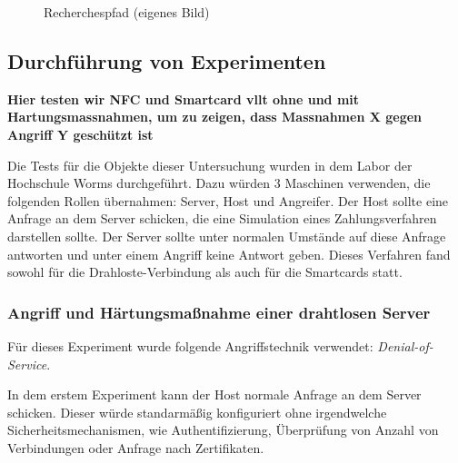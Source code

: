 \begin{landscape}
  \thispagestyle{mylandscape}
  \begin{figure}[h]  
  \centering
         \caption{Recherchespfad (eigenes Bild)}
          \label{fig:diagramfrage}
  \end{figure}
\end{landscape}


\subsection{Durchführung von Experimenten}
\textbf{Hier testen wir NFC und Smartcard vllt ohne und mit Hartungsmassnahmen, um zu zeigen, dass Massnahmen X gegen
Angriff Y geschützt ist}

Die Tests für die Objekte dieser Untersuchung wurden in dem Labor der Hochschule Worms durchgeführt. 
Dazu würden 3 Maschinen verwenden, die folgenden Rollen übernahmen: Server, Host und Angreifer. 
Der Host sollte eine Anfrage an dem Server schicken, die eine Simulation eines Zahlungsverfahren darstellen sollte.
Der Server sollte unter normalen Umstände auf diese Anfrage antworten und unter einem Angriff keine Antwort
geben. Dieses Verfahren fand sowohl für die Drahloste-Verbindung als auch für die Smartcards statt.


\subsubsection{Angriff und Härtungsmaßnahme einer drahtlosen Server}
Für dieses Experiment wurde folgende Angriffstechnik verwendet: \textit{Denial-of-Service}.

In dem erstem Experiment kann der Host normale Anfrage an dem Server schicken. Dieser würde standarmäßig konfiguriert
ohne irgendwelche Sicherheitsmechanismen, wie Authentifizierung, Überprüfung von Anzahl von Verbindungen oder Anfrage
nach Zertifikaten.

